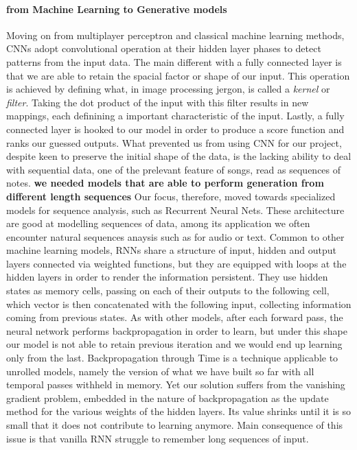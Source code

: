 \documentclass[12pt]{article}
\begin{document}
\paragraph{from Machine Learning to Generative models}
  Moving on from multiplayer perceptron and classical machine learning methods, CNNs adopt convolutional operation at their hidden layer phases to detect patterns from the input data. The main different with a fully connected layer is that we are able to retain the spacial factor or shape of our input. This operation is achieved by defining what, in image processing jergon, is called a \textit{kernel} or \textit{filter}. Taking the dot product of the input with this filter results in new mappings, each definining a important characteristic of the input. Lastly, a fully connected layer is hooked to our model in order to produce a score function and ranks our guessed outputs. What prevented us from using CNN for our project, despite keen to preserve the initial shape of the data, is the lacking ability to deal with sequential data, one of the prelevant feature of songs, read as sequences of notes.
  \textbf{we needed models that are able to perform generation from different length sequences}
  Our focus, therefore, moved towards specialized models for sequence analysis, such as Recurrent Neural Nets. These architecture are good at modelling sequences of data, among its application we
  often encounter natural sequences anaysis such as for audio or text. Common to other machine learning models, RNNs share a structure of input, hidden and output layers connected via weighted functions, but they are equipped with loops at the hidden layers in order to render the information persistent. They use hidden states as memory cells, passing on each of their outputs to the following cell, which vector is then concatenated with the following input, collecting information coming from previous states. As with other models, after each forward pass, the neural network performs backpropagation in order to learn, but under this shape our model is not able to retain previous iteration and we would end up learning only from the last. Backpropagation through Time is a technique applicable to unrolled models, namely the version of what we have built so far with all temporal passes withheld in memory. Yet our solution suffers from the vanishing gradient problem, embedded in the nature of backpropagation as the update method for the various weights of the hidden layers. Its value shrinks until it is so small that it does not contribute to learning anymore. Main consequence of this issue is that vanilla RNN struggle to remember long sequences of input.
\end{document}
